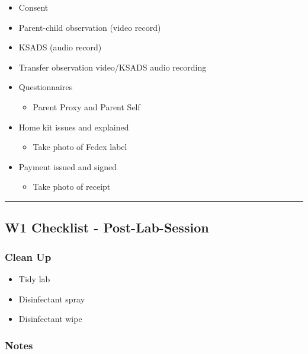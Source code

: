 \documentclass[
]{book}
\providecommand{\tightlist}{%
  \setlength{\itemsep}{0pt}\setlength{\parskip}{0pt}}
\begin{document}
\begin{itemize}
\tightlist
\item
  Consent
\item
  Parent-child observation (video record)
\item
  KSADS (audio record)
\item
  Transfer observation video/KSADS audio recording
\item
  Questionnaires

  \begin{itemize}
  \tightlist
  \item
    Parent Proxy and Parent Self
  \end{itemize}
\item
  Home kit issues and explained

  \begin{itemize}
  \tightlist
  \item
    Take photo of Fedex label
  \end{itemize}
\item
  Payment issued and signed

  \begin{itemize}
  \tightlist
  \item
    Take photo of receipt
  \end{itemize}
\end{itemize}

\begin{center}\rule{0.5\linewidth}{0.5pt}\end{center}

\hypertarget{w1-checklist---post-lab-session}{%
\subsection{W1 Checklist - Post-Lab-Session}\label{w1-checklist---post-lab-session}}

\hypertarget{clean-up}{%
\subsubsection{Clean Up}\label{clean-up}}

\begin{itemize}
\tightlist
\item
  Tidy lab
\item
  Disinfectant spray
\item
  Disinfectant wipe
\end{itemize}

\hypertarget{notes}{%
\subsubsection{Notes}\label{notes}}
\end{document}
